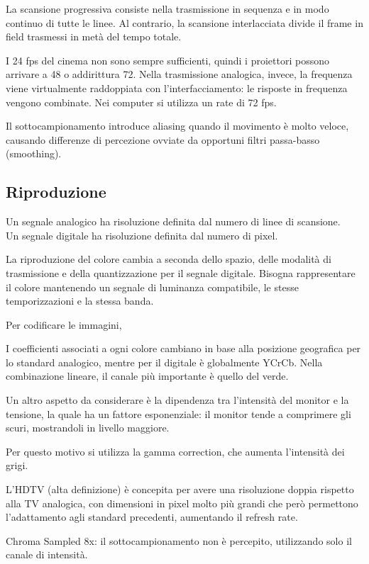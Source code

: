La scansione progressiva consiste nella trasmissione in sequenza e in modo continuo di tutte le linee. Al contrario, la scansione interlacciata divide il frame in field trasmessi in metà del tempo totale.

I 24 fps del cinema non sono sempre sufficienti, quindi i proiettori possono arrivare a 48 o addirittura 72. Nella trasmissione analogica, invece, la frequenza viene virtualmente raddoppiata con l'interfacciamento: le risposte in frequenza vengono combinate. Nei computer si utilizza un rate di 72 fps.

Il sottocampionamento introduce aliasing quando il movimento è molto veloce, causando differenze di percezione ovviate da opportuni filtri passa-basso (smoothing). 

\subsection{Riproduzione}
Un segnale analogico ha risoluzione definita dal numero di linee di scansione. \\
Un segnale digitale ha risoluzione definita dal numero di pixel.

La riproduzione del colore cambia a seconda dello spazio, delle modalità di trasmissione e della quantizzazione per il segnale digitale. Bisogna rappresentare il colore mantenendo un segnale di luminanza compatibile, le stesse temporizzazioni e la stessa banda.

Per codificare le immagini, 

I coefficienti associati a ogni colore cambiano in base alla posizione geografica per lo standard analogico, mentre per il digitale è globalmente YCrCb. Nella combinazione lineare, il canale più importante è quello del verde. 

Un altro aspetto da considerare è la dipendenza tra l'intensità del monitor e la tensione, la quale ha un fattore esponenziale: il monitor tende a comprimere gli scuri, mostrandoli in livello maggiore. 

Per questo motivo si utilizza la gamma correction, che aumenta l'intensità dei grigi. 

L'HDTV (alta definizione) è concepita per avere una risoluzione doppia rispetto alla TV analogica, con dimensioni in pixel molto più grandi che però permettono l'adattamento agli standard precedenti, aumentando il refresh rate.


Chroma Sampled 8x: il sottocampionamento non è percepito, utilizzando solo il canale di intensità.


